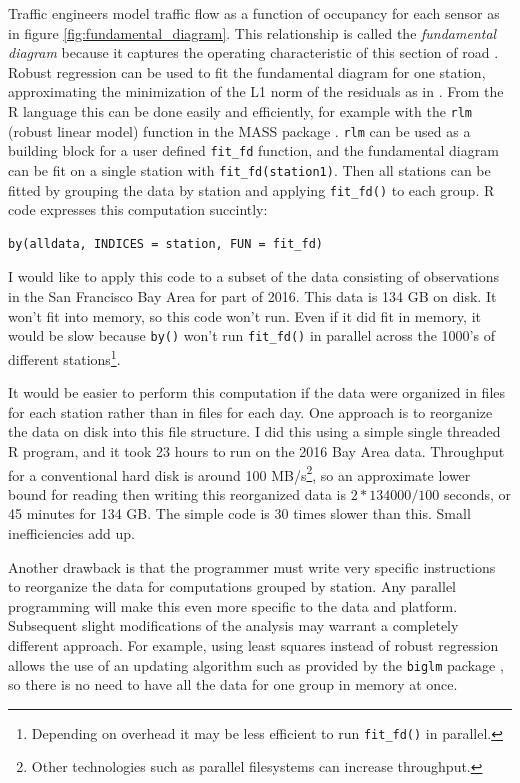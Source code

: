 \documentclass[12pt]{article}
\begin{document}
Traffic engineers model traffic flow as a function of occupancy for each
sensor as in figure \ref{fig:fundamental_diagram}. This relationship is
called the \emph{fundamental diagram} because it captures the operating
characteristic of this section of road \cite{daganzo1997fundamentals}. 
Robust regression can be used to fit the fundamental diagram for one
station, approximating the minimization of the L1 norm of the residuals as
in \cite{li2011fundamental}.  From the R language this can be done easily
and efficiently, for example with the \texttt{rlm} (robust linear model)
function in the MASS package \cite{venables2013modern}. \texttt{rlm} can be
used as a building block for a user defined \texttt{fit\_fd} function, and
the fundamental diagram can be fit on a single station with
\texttt{fit\_fd(station1)}. Then all stations can be fitted
by grouping the data by station and
applying \texttt{fit\_fd()} to each group.
R code expresses this computation succintly:

\begin{verbatim}
by(alldata, INDICES = station, FUN = fit_fd)
\end{verbatim}

I would like to apply this code to a subset of the data consisting of
observations in the San Francisco Bay Area for part of 2016.  This data is
134 GB on disk. It won't fit into memory, so this code won't run.  Even
if it did fit in memory, it would be slow because \texttt{by()} won't run
\texttt{fit\_fd()} in parallel across the 1000's of different
stations\footnote{ Depending on overhead it may be less efficient to run
\texttt{fit\_fd()} in parallel.}.

It would be easier to perform this computation if the data were
organized in files for each station rather than in files for each day.  One
approach is to reorganize the data on disk into this file structure. I
did this using a simple single threaded R program, and it took 23 hours to
run on the 2016 Bay Area data.  Throughput for a conventional hard disk is around
100 MB/s\footnote{Other technologies such as parallel filesystems can
increase throughput.}, so an approximate lower bound for reading then
writing this reorganized data is $2 * 134000 / 100$ seconds, or 45 minutes
for 134 GB.  The simple code is 30 times slower than this. Small
inefficiencies add up.

Another drawback is that the programmer must write very specific
instructions to reorganize the data for computations grouped by station.
Any parallel programming will make this even more specific to the data and
platform. Subsequent slight modifications of the analysis may warrant a
completely different approach. For example, using least squares instead of
robust regression allows the use of an updating algorithm such as provided
by the \texttt{biglm} package \cite{R-biglm}, so there is no need to have
all the data for one group in memory at once.
\end{document}
